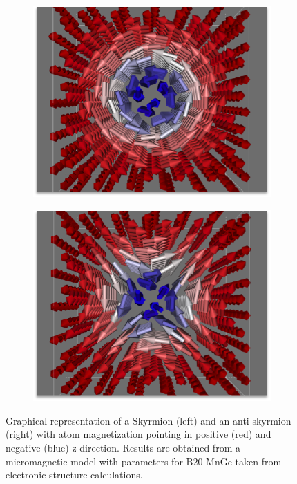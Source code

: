 \documentclass [a4paper, 12pt]{article}
\begin{document}
\begin{figure}[h]
	\centering
	\begin{subfigure}{.5\textwidth}
		  \centering
		  \includegraphics[width=.99\linewidth]{Figures/MnGe_skyrmion.png}
		  \label{fig:sub1}
	\end{subfigure}%
	\begin{subfigure}{.5\textwidth}
		  \centering
		  \includegraphics[width=.99\linewidth]{Figures/MnGe_antiskyrmion.png}
                  \label{fig:sub2}
	\end{subfigure}
	\caption{Graphical representation of a Skyrmion (left) and an anti-skyrmion (right) 
	with atom magnetization pointing in positive (red) and negative (blue) z-direction. Results
	are obtained from a micromagnetic model with parameters for B20-MnGe
	taken from electronic structure calculations.}
	\label{fig:sd_results}
\end{figure}
\end{document}
